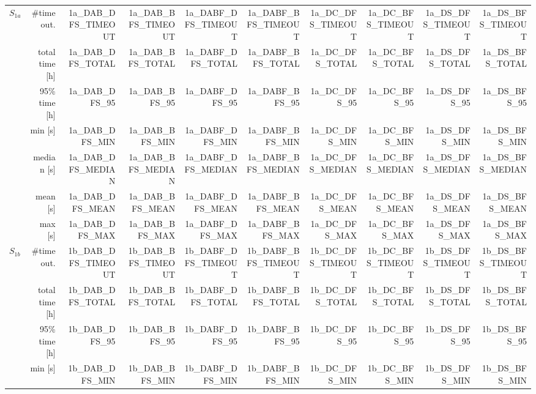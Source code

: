 \begin{table}
{\begin{tabular}{|l|r|r|r|r|r|r|r|r|r|}
\hline
\hline
\multirow{7}{*}{\Large{$S_{1a}$}}   & \#timeout. & 1a_DAB_DFS_TIMEOUT & 1a_DAB_BFS_TIMEOUT & 1a_DABF_DFS_TIMEOUT & 1a_DABF_BFS_TIMEOUT & 1a_DC_DFS_TIMEOUT & 1a_DC_BFS_TIMEOUT & 1a_DS_DFS_TIMEOUT & 1a_DS_BFS_TIMEOUT  \\
                      & total time [h] & 1a_DAB_DFS_TOTAL   & 1a_DAB_BFS_TOTAL   & 1a_DABF_DFS_TOTAL   & 1a_DABF_BFS_TOTAL   & 1a_DC_DFS_TOTAL   & 1a_DC_BFS_TOTAL   & 1a_DS_DFS_TOTAL   & 1a_DS_BFS_TOTAL  \\
                      & 95\% time [h]  & 1a_DAB_DFS_95      & 1a_DAB_BFS_95      & 1a_DABF_DFS_95      & 1a_DABF_BFS_95      & 1a_DC_DFS_95      & 1a_DC_BFS_95      & 1a_DS_DFS_95      & 1a_DS_BFS_95  \\
\cline{2-10}
                      & min [s]        & 1a_DAB_DFS_MIN     & 1a_DAB_BFS_MIN     & 1a_DABF_DFS_MIN     & 1a_DABF_BFS_MIN     & 1a_DC_DFS_MIN     & 1a_DC_BFS_MIN     & 1a_DS_DFS_MIN     & 1a_DS_BFS_MIN  \\
                      & median [s]     & 1a_DAB_DFS_MEDIAN  & 1a_DAB_BFS_MEDIAN  & 1a_DABF_DFS_MEDIAN  & 1a_DABF_BFS_MEDIAN  & 1a_DC_DFS_MEDIAN  & 1a_DC_BFS_MEDIAN  & 1a_DS_DFS_MEDIAN  & 1a_DS_BFS_MEDIAN  \\
                      & mean [s]       & 1a_DAB_DFS_MEAN    & 1a_DAB_BFS_MEAN    & 1a_DABF_DFS_MEAN    & 1a_DABF_BFS_MEAN    & 1a_DC_DFS_MEAN    & 1a_DC_BFS_MEAN    & 1a_DS_DFS_MEAN    & 1a_DS_BFS_MEAN  \\
                      & max [s]        & 1a_DAB_DFS_MAX     & 1a_DAB_BFS_MAX     & 1a_DABF_DFS_MAX     & 1a_DABF_BFS_MAX     & 1a_DC_DFS_MAX     & 1a_DC_BFS_MAX     & 1a_DS_DFS_MAX     & 1a_DS_BFS_MAX  \\
\hline
\hline
\multirow{7}{*}{\Large{$S_{1b}$}}   & \#timeout. & 1b_DAB_DFS_TIMEOUT & 1b_DAB_BFS_TIMEOUT & 1b_DABF_DFS_TIMEOUT & 1b_DABF_BFS_TIMEOUT & 1b_DC_DFS_TIMEOUT & 1b_DC_BFS_TIMEOUT & 1b_DS_DFS_TIMEOUT & 1b_DS_BFS_TIMEOUT  \\
                      & total time [h] & 1b_DAB_DFS_TOTAL   & 1b_DAB_BFS_TOTAL   & 1b_DABF_DFS_TOTAL   & 1b_DABF_BFS_TOTAL   & 1b_DC_DFS_TOTAL   & 1b_DC_BFS_TOTAL   & 1b_DS_DFS_TOTAL   & 1b_DS_BFS_TOTAL    \\
                      & 95\% time [h]  & 1b_DAB_DFS_95      & 1b_DAB_BFS_95      & 1b_DABF_DFS_95      & 1b_DABF_BFS_95      & 1b_DC_DFS_95      & 1b_DC_BFS_95      & 1b_DS_DFS_95      & 1b_DS_BFS_95       \\ 
\cline{2-10}
                      & min [s]        & 1b_DAB_DFS_MIN     & 1b_DAB_BFS_MIN     & 1b_DABF_DFS_MIN     & 1b_DABF_BFS_MIN     & 1b_DC_DFS_MIN     & 1b_DC_BFS_MIN     & 1b_DS_DFS_MIN     & 1b_DS_BFS_MIN       \\

\end{tabular}}
\end{table}
